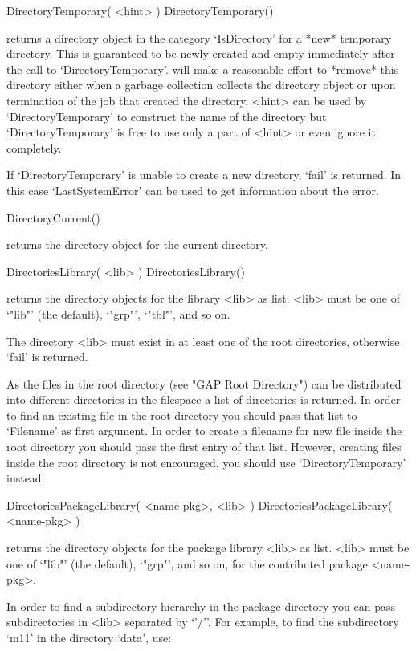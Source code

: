 \>DirectoryTemporary( <hint> )
\)DirectoryTemporary()

returns  a directory  object in the   category `IsDirectory' for a  *new*
temporary directory.   This is guaranteed to  be  newly created and empty
immediately  after the call to `DirectoryTemporary'.   {\GAP} will make a
reasonable effort   to *remove* this   directory  either  when a  garbage
collection  collects the directory   object  or upon termination  of  the
{\GAP}   job that   created  the  directory.     <hint> can  be  used  by
`DirectoryTemporary' to construct    the  name  of the    directory   but
`DirectoryTemporary' is free to use only a  part of <hint> or even ignore
it completely.

If `DirectoryTemporary' is  unable to create a  new  directory, `fail' is
returned.  In this case `LastSystemError' can be  used to get information
about the error.

\>DirectoryCurrent()

returns the directory object for the current directory.

\>DirectoriesLibrary( <lib> )
\)DirectoriesLibrary()

returns the  directory objects  for  the  {\GAP}  library <lib>  as list.
<lib> must be one of `"lib"' (the default), `"grp"', `"tbl"', and so on.

The directory <lib> must exist in at  least one of the root directories,
otherwise `fail' is returned.

As the files in the {\GAP} root  directory (see "GAP Root Directory") can
be  distributed  into different  directories in the  filespace  a list of
directories is returned.  In order to find an existing file in the {\GAP}
root directory you should pass that list to `Filename' as first argument.
In order to  create  a filename   for  new file  inside the  {\GAP}  root
directory you   should pass  the first  entry    of that list.   However,
creating files  inside the {\GAP} root  directory is not  encouraged, you
should use `DirectoryTemporary' instead.

\>DirectoriesPackageLibrary( <name-pkg>, <lib> )
\)DirectoriesPackageLibrary( <name-pkg> )

returns  the   directory objects  for   the   package library   <lib>  as
list. <lib> must be one of `"lib"' (the default), `"grp"', and so on, for
the contributed package <name-pkg>.

In order to  find a subdirectory hierarchy in  the package  directory you
can  pass subdirectories in <lib> separated  by `{'/'}'.  For example, to
find the subdirectory `m11' in the directory `data', use:

